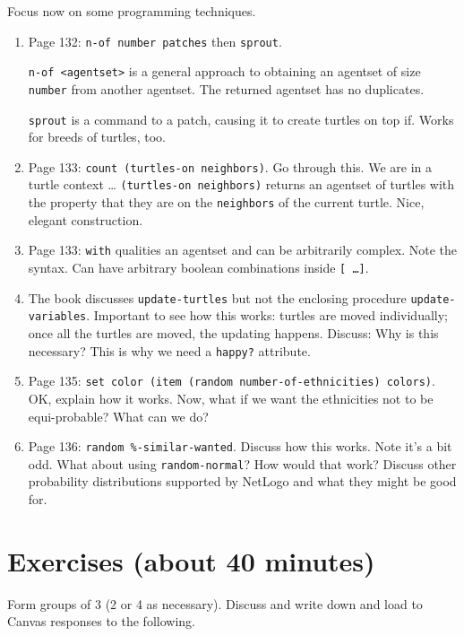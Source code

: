 Focus now on some programming techniques.
\begin{enumerate}
\item Page 132: \texttt{n-of number patches} then \texttt{sprout}.

\texttt{n-of <agentset>} is a general approach to obtaining an agentset of size \texttt{number} from another agentset. The returned agentset has no duplicates.  

\texttt{sprout} is a command to a patch, causing it to create turtles on top if. Works for breeds of turtles, too.

\item Page 133: \texttt{count (turtles-on neighbors)}. Go through this. We are in a turtle context \ldots 
\texttt{(turtles-on neighbors)} returns an agentset of turtles with the property that they are on the \texttt{neighbors} of the current turtle. Nice, elegant construction.

\item Page 133: \texttt{with} qualities an agentset and can be arbitrarily complex. Note the syntax. Can have arbitrary boolean combinations inside \texttt{[ \ldots ]}.

\item The book discusses \texttt{update-turtles} but not the enclosing procedure \texttt{update-variables}. Important to see how this works: turtles are moved individually; once all the turtles are moved, the updating happens. Discuss: Why is this necessary? This is why we need a \texttt{happy?} attribute.

\item Page 135: \texttt{set color (item (random number-of-ethnicities) colors)}. OK, explain how it works. Now, what if we want the ethnicities not to be equi-probable? What can we do?

\item Page 136: \texttt{random \%-similar-wanted}. Discuss how this works. Note it's a bit odd. What about using \texttt{random-normal}? How would that work?  Discuss other probability distributions supported by NetLogo and what they might be good for.
\end{enumerate}

\section{Exercises (about 40 minutes)}

Form groups of 3 (2 or 4 as necessary). Discuss and write down and load to Canvas responses to the following.

